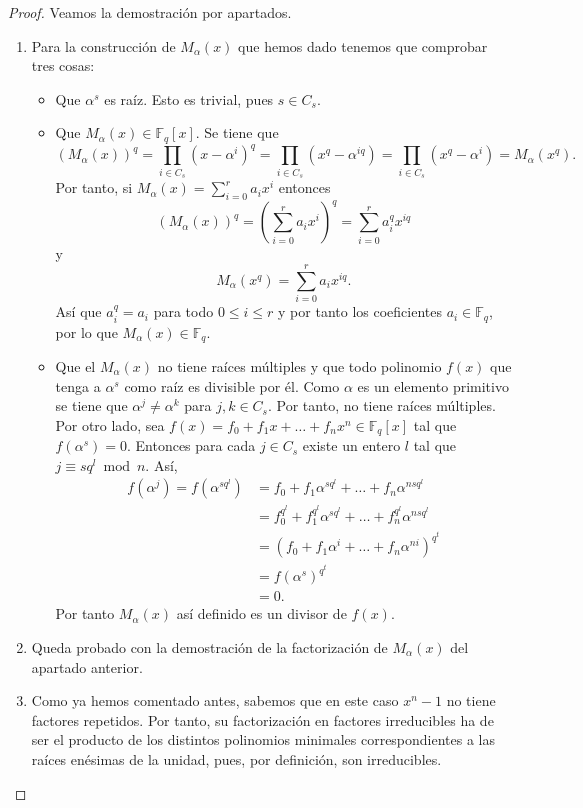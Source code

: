 \begin{proof}
  Veamos la demostración por apartados.
  \begin{enumerate}
    \item Para la construcción de \(M_{\alpha}(x)\) que hemos dado tenemos que comprobar tres cosas:
    \begin{itemize}
      \item Que \(\alpha^{s}\) es raíz. Esto es trivial, pues \(s \in C_s\).
      \item Que \(M_{\alpha}(x) \in \mathbb F_q[x]\).
      Se tiene que
      \[
        (M_{\alpha}(x))^{q} = \prod_{i \in C_s}(x - \alpha^i)^q = \prod_{i \in C_s}(x^q - \alpha^{iq}) = \prod_{i \in C_s}(x^q - \alpha^i) = M_{\alpha}(x^q).
      \]
      Por tanto, si \(M_{\alpha}(x) = \sum_{i=0}^{r}a_ix^{i}\) entonces
      \[
        (M_{\alpha}(x))^{q} = \left(\sum_{i=0}^{r}a_ix^{i}\right)^{q} = \sum_{i=0}^{r}a_i^qx^{iq}
      \] y 
      \[
        M_{\alpha}(x^q) = \sum_{i=0}^{r}a_ix^{iq}.
      \]
      Así que \(a_{i}^{q} = a_{i}\) para todo \(0 \leq i \leq r\) y por tanto los coeficientes \(a_i \in \mathbb F_q\), por lo que \(M_{\alpha}(x) \in \mathbb{F}_q\).
      \item Que el \(M_{\alpha}(x)\) no tiene raíces múltiples y que todo polinomio \(f(x)\) que tenga a \(\alpha^{s}\) como raíz es divisible por él. 
      Como \(\alpha\) es un elemento primitivo se tiene que \(\alpha^j \neq \alpha^k\) para \(j, k \in C_s\).
      Por tanto, no tiene raíces múltiples.
      Por otro lado, sea \(f(x) = f_0 + f_1x + \dots + f_n x^{n} \in \mathbb F_q[x]\) tal que \(f(\alpha^{s}) = 0\).
      Entonces para cada \(j \in C_s\) existe un entero \(l\) tal que \(j \equiv sq^l \bmod n\).
      Así,
      \begin{align*}
        f(\alpha^j) = f(\alpha^{sq^l}) &= f_0 + f_1\alpha^{sq^l} + \dots + f_n \alpha^{nsq^l}\\
          &= f_{0}^{q^l} + f_{1}^{q^l}\alpha^{sq^l} + \dots + f_{n}^{q^l}\alpha^{nsq^l} \\
          &= (f_0 + f_1\alpha^{i} + \dots + f_n\alpha^{ni})^{q^t}\\
          &= f(\alpha^{s})^{q^t}\\
          &= 0.
      \end{align*}
      Por tanto \(M_{\alpha}(x)\) así definido es un divisor de \(f(x)\).
    \end{itemize}
    \item Queda probado con la demostración de la factorización de \(M_{\alpha}(x)\) del apartado anterior.
    \item Como ya hemos comentado antes, sabemos que en este caso \(x^n - 1\) no tiene factores repetidos.
    Por tanto, su factorización en factores irreducibles ha de ser el producto de los distintos polinomios minimales correspondientes a las raíces enésimas de la unidad, pues, por definición, son irreducibles.\qedhere
  \end{enumerate}
\end{proof}

